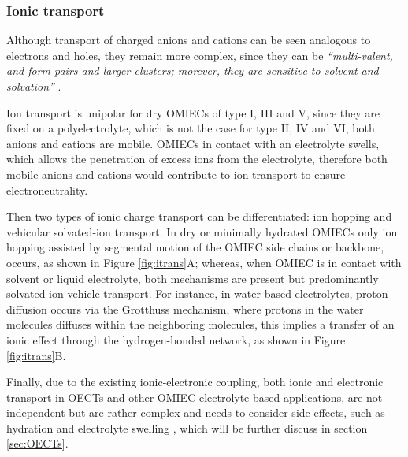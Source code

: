 \subsubsection{Ionic transport}
Although transport of charged anions and cations can be seen analogous to electrons and holes, they remain more complex, since they can be \textit{``multi-valent, and form pairs and larger clusters; morever, they are sensitive to solvent and solvation''} \cite{paulsenOrganicMixedIonic2020}.

Ion transport is unipolar for dry OMIECs of type I, III and V, since they are fixed on a polyelectrolyte, which is not the case for type II, IV and VI, both anions and cations are mobile. OMIECs in contact with an electrolyte swells, which allows the penetration of excess ions from the electrolyte, therefore both mobile anions and cations would contribute to ion transport to ensure electroneutrality. 

Then two types of ionic charge transport can be differentiated: ion hopping and vehicular solvated-ion transport. In dry or minimally hydrated OMIECs only ion hopping assisted by segmental motion of the OMIEC side chains or backbone, occurs, as shown in Figure \ref{fig:itrans}A; whereas, when OMIEC is in contact with solvent or liquid electrolyte, both mechanisms are present but predominantly solvated ion vehicle transport. For instance, in water-based electrolytes, proton diffusion occurs via the Grotthuss mechanism, where protons in the water molecules diffuses within the neighboring molecules, this implies a transfer of an ionic effect through the hydrogen-bonded network, as shown in Figure \ref{fig:itrans}B.

Finally, due to the existing ionic-electronic coupling, both ionic and electronic transport in OECTs and other OMIEC-electrolyte based applications, are not independent but are rather complex and needs to consider side effects, such as hydration and electrolyte swelling \cite{paulsenOrganicMixedIonic2020}, which will be further discuss in section \ref{sec:OECTs}.

